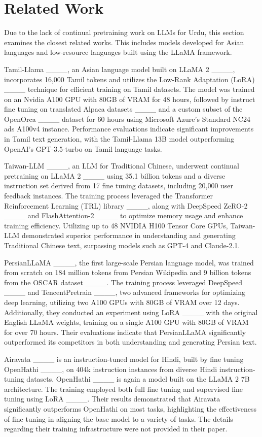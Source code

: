 \section{Related Work}
\label{sec:literature}
Due to the lack of continual pretraining work on LLMs for Urdu, this section examines the closest related works. This includes models developed for Asian languages and low-resource languages built using the LLaMA framework.

Tamil-Llama ____, an Asian language model built on LLaMA 2 ____, incorporates 16,000 Tamil tokens and utilizes the Low-Rank Adaptation (LoRA) ____ technique for efficient training on Tamil datasets. The model was trained on an Nvidia A100 GPU with 80GB of VRAM for 48 hours, followed by instruct fine tuning on translated Alpaca datasets ____ and a custom subset of the OpenOrca ____ dataset for 60 hours using Microsoft Azure’s Standard NC24 ads A100v4 instance. Performance evaluations indicate significant improvements in Tamil text generation, with the Tamil-Llama 13B model outperforming OpenAI's GPT-3.5-turbo on Tamil language tasks.

Taiwan-LLM ____, an LLM for Traditional Chinese, underwent continual pretraining on LLaMA 2 ____ using 35.1 billion tokens and a diverse instruction set derived from 17 fine tuning datasets, including 20,000 user feedback instances. The training process leveraged the Transformer Reinforcement Learning (TRL) library ____, along with DeepSpeed ZeRO-2 ____ and FlashAttention-2 ____ to optimize memory usage and enhance training efficiency. Utilizing up to 48 NVIDIA H100 Tensor Core GPUs, Taiwan-LLM demonstrated superior performance in understanding and generating Traditional Chinese text, surpassing models such as GPT-4 and Claude-2.1.

PersianLLaMA ____, the first large-scale Persian language model, was trained from scratch on 184 million tokens from Persian Wikipedia and 9 billion tokens from the OSCAR dataset ____. The training process leveraged DeepSpeed ____ and TencentPretrain ____, two advanced frameworks for optimizing deep learning, utilizing two A100 GPUs with 80GB of VRAM over 12 days. Additionally, they conducted an experiment using LoRA ____ with the original English LLaMA weights, training on a single A100 GPU with 80GB of VRAM for over 70 hours. Their evaluations indicate that PersianLLaMA significantly outperformed its competitors in both understanding and generating Persian text. 

Airavata ____ is an instruction-tuned model for Hindi, built by fine tuning OpenHathi ____, on 404k instruction instances from diverse Hindi instruction-tuning datasets. OpenHathi ____ is again a model built on the LLaMA 2 7B architecture. The training employed both full fine tuning and supervised fine tuning using LoRA ____. Their results demonstrated that Airavata significantly outperforms OpenHathi on most tasks, highlighting the effectiveness of fine tuning in aligning the base model to a variety of tasks. The details regarding their training infrastructure were not provided in their paper.

